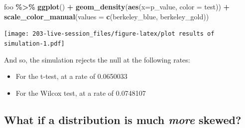 \documentclass[
]{book}
\newenvironment{Shaded}{\begin{snugshade}}{\end{snugshade}}
\newcommand{\AttributeTok}[1]{\textcolor[rgb]{0.13,0.29,0.53}{#1}}
\newcommand{\FunctionTok}[1]{\textcolor[rgb]{0.13,0.29,0.53}{\textbf{#1}}}
\newcommand{\NormalTok}[1]{#1}
\newcommand{\SpecialCharTok}[1]{\textcolor[rgb]{0.81,0.36,0.00}{\textbf{#1}}}
\providecommand{\tightlist}{%
  \setlength{\itemsep}{0pt}\setlength{\parskip}{0pt}}
\theoremstyle{definition}
\theoremstyle{definition}
\theoremstyle{definition}
\theoremstyle{definition}
\theoremstyle{remark}
\begin{document}
\begin{Shaded}
\begin{Highlighting}[]
\NormalTok{foo }\SpecialCharTok{\%\textgreater{}\%}
  \FunctionTok{ggplot}\NormalTok{() }\SpecialCharTok{+}
  \FunctionTok{geom\_density}\NormalTok{(}\FunctionTok{aes}\NormalTok{(}\AttributeTok{x=}\NormalTok{p\_value, }\AttributeTok{color =}\NormalTok{ test)) }\SpecialCharTok{+}
  \FunctionTok{scale\_color\_manual}\NormalTok{(}\AttributeTok{values =} \FunctionTok{c}\NormalTok{(berkeley\_blue, berkeley\_gold))}
\end{Highlighting}
\end{Shaded}

\texttt{[image: 203-live-session\_files/figure-latex/plot results of simulation-1.pdf]}

And so, the simulation rejects the null at the following rates:

\begin{itemize}
\tightlist
\item
  For the t-test, at a rate of 0.0650033
\item
  For the Wilcox test, at a rate of 0.0748107
\end{itemize}

\hypertarget{what-if-a-distribution-is-much-more-skewed}{%
\subsection{\texorpdfstring{What if a distribution is much \emph{more} skewed?}{What if a distribution is much more skewed?}}\label{what-if-a-distribution-is-much-more-skewed}}
\end{document}
